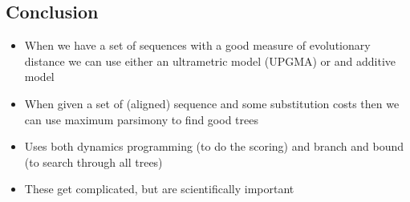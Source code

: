 \begin{slide}
\section{Conclusion}

\begin{PauseHighLight}
  \begin{itemize}
  \item When we have a set of sequences with a good measure of
    evolutionary distance we can use either an ultrametric model (UPGMA)
    or and additive model\pause
  \item When given a set of (aligned) sequence and some substitution
    costs then we can use maximum parsimony to find good trees\pause
  \item Uses both dynamics programming (to do the scoring) and branch
    and bound (to search through all trees)\pause
  \item These get complicated, but are scientifically important\pause
  \end{itemize}
\end{PauseHighLight}

\end{slide}
